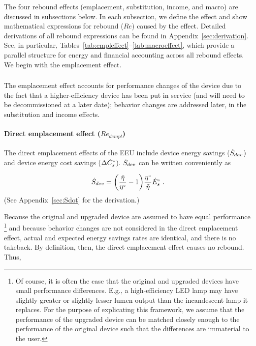 \documentclass[12pt]{article}\usepackage[]{graphicx}\usepackage[]{xcolor}
\begin{document}
The four rebound effects
(emplacement, substitution, income, and macro)
are discussed in subsections below.
In each subsection, we
define the effect and
show mathematical expressions for rebound ($Re$) caused by the effect.
Detailed derivations of all rebound expressions 
can be found in Appendix~\ref{sec:derivation}.
See, in particular, Tables~\ref{tab:empleffect}--\ref{tab:macroeffect},
which provide a parallel structure for energy and financial accounting
across all rebound effects.
We begin with the emplacement effect.


\subsubsection{\Empleffect}
\label{sec:empl_effect_main_paper}

The emplacement effect accounts for performance changes of the device
due to the fact that a higher-efficiency device has been put in service 
(and will need to be decommissioned at a later date);
behavior changes are addressed later,
in the substitution and income effects. 


\paragraph{Direct emplacement effect ($Re_{dempl}$)} 

The direct emplacement effects of the EEU include
device energy savings ($\dot{S}_{dev}$) and device energy cost savings ($\Delta {\dot{C}}^*_s$).
$\dot{S}_{dev}$ can be written conveniently as

\begin{equation} \label{eq:Sdot}
  \dot{S}_{dev} = \left( \frac{\tilde{\eta}}{{}{\eta}^{\scriptscriptstyle \circ}} - 1 \right)\! \frac{{}{\eta}^{\scriptscriptstyle \circ}}{\tilde{\eta}} {}{\dot{E}}^{\scriptscriptstyle \circ}_s \; .
\end{equation}
%
(See Appendix~\ref{sec:Sdot} for the derivation.)

Because the original and upgraded device are assumed to 
have equal performance%
\footnote{
  Of course, it is often the case that the original and upgraded devices
  have small performance differences. 
  E.g., a high-efficiency LED lamp may have slightly greater or slightly lesser 
  lumen output than the incandescent lamp it replaces. 
  For the purpose of explicating this framework,
  we assume that the performance of the upgraded device can be matched closely enough
  to the performance of the original device 
  such that the differences are immaterial to the user.
}
%
and because
behavior changes are not considered in the direct emplacement effect,
actual and expected energy savings rates are identical, and
there is no takeback.
By definition, then, the direct emplacement effect causes no rebound.
Thus, 
\end{document}
